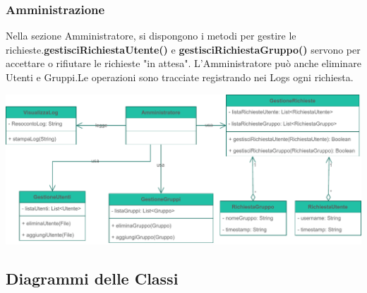 \pagebreak
\subsubsection*{Amministrazione}
{}
\vspace{0.5cm}

Nella sezione Amministratore, si dispongono i metodi per gestire le richieste.\linebreak \textbf{gestisciRichiestaUtente()} e \textbf{gestisciRichiestaGruppo()} servono per accettare o rifiutare le richieste "in attesa". L'Amministratore può anche eliminare Utenti e Gruppi.Le operazioni sono tracciate registrando nei Logs ogni richiesta.

\vspace{0.5cm}
\begin{adjustwidth}{-2.5cm}{0cm}
\includegraphics[scale=0.9]{dominio/Dominio-Amministrazione.drawio.pdf}
\end{adjustwidth}
\pagebreak

{}


\subsection*{Diagrammi delle Classi}

